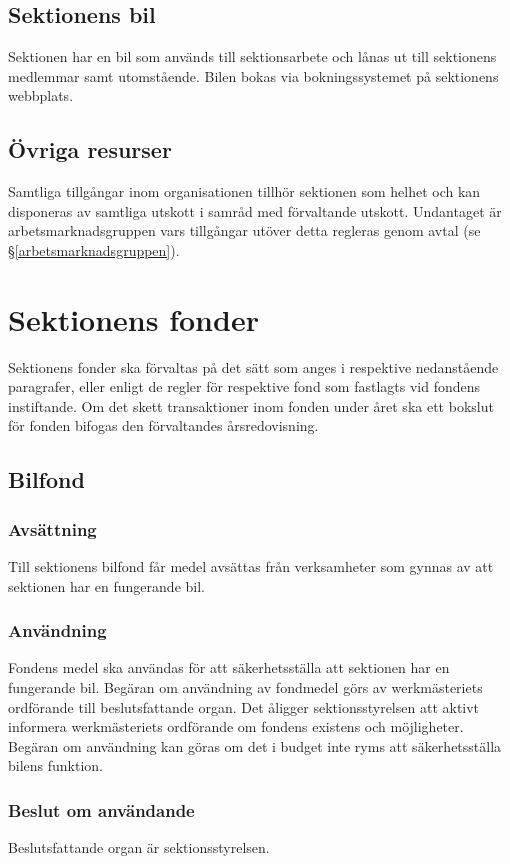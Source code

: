 \documentclass{datateknologsektionen-document}
\begin{document}
\subsection{Sektionens bil}
Sektionen har en bil som används till sektionsarbete och lånas ut till sektionens medlemmar samt
utomstående. Bilen bokas via bokningssystemet på sektionens webbplats.

\subsection{Övriga resurser}
Samtliga tillgångar inom organisationen tillhör sektionen som helhet och kan disponeras
av samtliga utskott i samråd med förvaltande utskott. Undantaget är arbetsmarknadsgruppen
vars tillgångar utöver detta regleras genom avtal (se \S \ref{arbetsmarknadsgruppen}).

\section{Sektionens fonder}
\label{fonder}
Sektionens fonder ska förvaltas på det sätt som anges i respektive nedanstående paragrafer, eller
enligt de regler för respektive fond som fastlagts vid fondens instiftande. Om det skett
transaktioner inom fonden under året ska ett bokslut för fonden bifogas den förvaltandes
årsredovisning.

\subsection{Bilfond}
\subsubsection{Avsättning}
Till sektionens bilfond får medel avsättas från verksamheter som gynnas av att sektionen har en
fungerande bil.

\subsubsection{Användning}
Fondens medel ska användas för att säkerhetsställa att sektionen har en fungerande bil.
Begäran om användning av fondmedel görs av werkmästeriets ordförande till beslutsfattande
organ. Det åligger sektionsstyrelsen att aktivt informera werkmästeriets ordförande om
fondens existens och möjligheter. Begäran om användning kan göras om det i budget inte
ryms att säkerhetsställa bilens funktion.

\subsubsection{Beslut om användande}
Beslutsfattande organ är sektionsstyrelsen.
\end{document}

